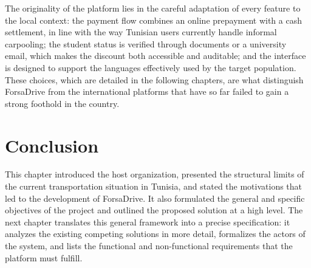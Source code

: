 The originality of the platform lies in the careful adaptation of every feature to the local context: the payment flow combines an online prepayment with a cash settlement, in line with the way Tunisian users currently handle informal carpooling; the student status is verified through documents or a university email, which makes the discount both accessible and auditable; and the interface is designed to support the languages effectively used by the target population. These choices, which are detailed in the following chapters, are what distinguish ForsaDrive from the international platforms that have so far failed to gain a strong foothold in the country.


\section*{Conclusion}

This chapter introduced the host organization, presented the structural limits of the current transportation situation in Tunisia, and stated the motivations that led to the development of ForsaDrive. It also formulated the general and specific objectives of the project and outlined the proposed solution at a high level. The next chapter translates this general framework into a precise specification: it analyzes the existing competing solutions in more detail, formalizes the actors of the system, and lists the functional and non-functional requirements that the platform must fulfill.